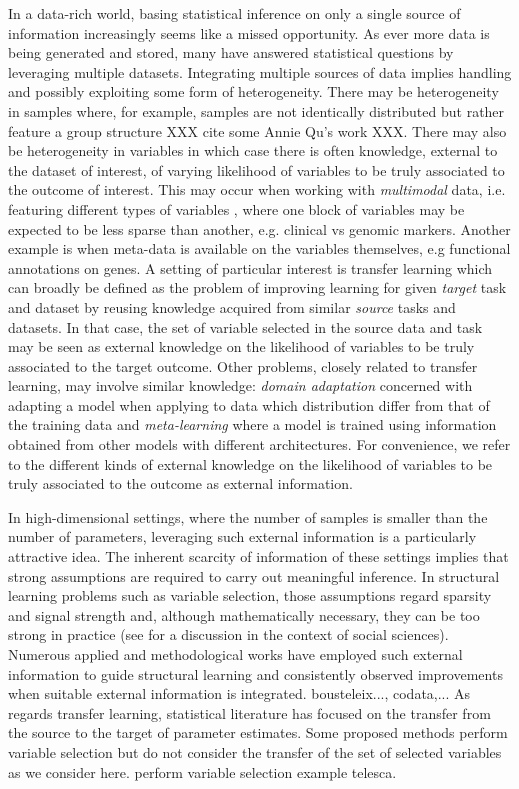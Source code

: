 \documentclass{article}
\begin{document}
In a data-rich world, basing statistical inference on only a single source of information increasingly seems like a missed opportunity. As ever more data is being generated and stored, many have answered statistical questions by 
leveraging multiple datasets. Integrating multiple sources of data implies handling and possibly exploiting some form of heterogeneity. There may be heterogeneity in samples where, for example, samples are not identically distributed but rather feature a group structure XXX cite some Annie Qu's work XXX. There may also be heterogeneity in variables in which case there is often knowledge, external to the dataset of interest, of varying likelihood of variables to be truly associated to the outcome of interest. This may occur when working with \textit{multimodal} data, i.e. featuring different types of variables \cite{}, where one block of variables may be expected to be less sparse than another, e.g. clinical vs genomic markers. Another example is when meta-data is available on the variables themselves, e.g functional annotations on genes. A setting of particular interest is transfer learning which %
can broadly be defined as the problem of improving learning for given \textit{target} task and dataset by reusing knowledge acquired from similar \textit{source} tasks and datasets. In that case, the set of variable selected in the source data and task may be seen as external knowledge on the likelihood of variables to be truly associated to the target outcome. Other problems, closely related to transfer learning, may involve similar knowledge:
\textit{domain adaptation} concerned with adapting a model when applying to data which distribution differ from that of the training data and \textit{meta-learning} where a model is trained using information obtained
from other models with different architectures. For convenience, we refer to the different kinds of external knowledge on the likelihood of variables to be truly associated to the outcome as external information.   

In high-dimensional settings, where the number of samples is smaller than the number of parameters, leveraging such 
external information is a particularly attractive idea. The inherent scarcity of information of these settings implies that strong assumptions are required to carry out meaningful inference. In structural learning problems such as variable selection, those assumptions regard sparsity and signal strength and, although mathematically necessary, they can be too strong in practice 
(see \citep{giannone2021economic} for a discussion in the context of social sciences). Numerous applied and methodological works have employed such external information to guide structural learning and consistently observed improvements when suitable external information is integrated. bousteleix..., codata,... As regards transfer learning, statistical literature has focused on the transfer from the source to the target of parameter estimates. Some proposed methods perform variable selection but do not consider the transfer of the set of selected variables as we consider here.  perform variable selection example telesca.
\end{document}
